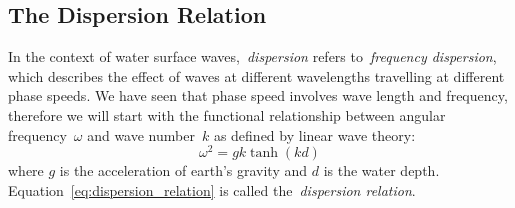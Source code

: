 \subsection{The Dispersion Relation}
\label{sec:dispersion_relation}

In the context of water surface waves,~\emph{dispersion} refers to~\emph{frequency dispersion}, which describes
the effect of waves at different wavelengths travelling at different phase speeds. We have seen that
phase speed involves wave length and frequency, therefore we will start with the functional relationship
between angular frequency~$\omega$ and wave number~$k$ as defined by linear wave theory:
\begin{equation}
\label{eq:dispersion_relation}
 \omega^2 = gk\tanh(kd)
\end{equation}
%
where $g$ is the acceleration of earth's gravity and $d$ is the water depth. Equation~\ref{eq:dispersion_relation}
is called the~\emph{dispersion relation}.\\

